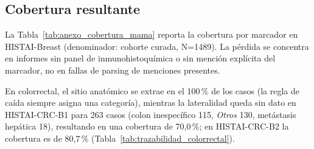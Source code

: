 \subsection{Cobertura resultante}

La Tabla~\ref{tab:anexo_cobertura_mama} reporta la cobertura por marcador en HISTAI-Breast (denominador: cohorte curada, N=1489). La pérdida se concentra en informes sin panel de inmunohistoquímica o sin mención explícita del marcador, no en fallas de parsing de menciones presentes.

\begin{table}[htbp]
\centering
\caption{Cobertura y distribución de clases por marcador en HISTAI-Breast tras la extracción textual.}
\label{tab:anexo_cobertura_mama}
\footnotesize
\setlength{\tabcolsep}{3pt}
\end{table}

En colorrectal, el sitio anatómico se extrae en el 100\,\% de los casos (la regla de caída siempre asigna una categoría), mientras la lateralidad queda sin dato en HISTAI-CRC-B1 para 263 casos (colon inespecífico 115, \emph{Otros} 130, metástasis hepática 18), resultando en una cobertura de 70,0\,\%; en HISTAI-CRC-B2 la cobertura es de 80,7\,\% (Tabla~\ref{tab:trazabilidad_colorrectal}).
